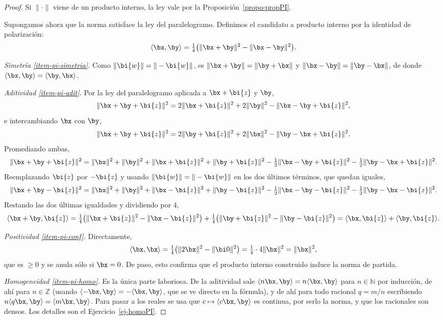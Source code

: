 \begin{proof}
Si $\|\cdot\|$ viene de un producto interno, la ley vale por la
Proposición~\ref{propo-propPI}.

Supongamos ahora que la norma satisface la ley del paralelogramo. Definimos
el candidato a producto interno por la identidad de polarización:
\[
\langle\bx,\by\rangle=\tfrac14\big(\|\bx+\by\|^2-\|\bx-\by\|^2\big) .
\]

\emph{Simetría \ref{item-pi-simetria}.} Como $\|\bi{w}\|=\|-\bi{w}\|$, es
$\|\bx+\by\|=\|\by+\bx\|$ y $\|\bx-\by\|=\|\by-\bx\|$, de donde
$\langle\bx,\by\rangle=\langle\by,\bx\rangle$.

\emph{Aditividad \ref{item-pi-adit}.} Por la ley del paralelogramo aplicada a
$\bx+\bi{z}$ y $\by$,
\[
\|\bx+\by+\bi{z}\|^2=2\|\bx+\bi{z}\|^2+2\|\by\|^2-\|\bx-\by+\bi{z}\|^2 ,
\]
e intercambiando $\bx$ con $\by$,
\[
\|\bx+\by+\bi{z}\|^2=2\|\by+\bi{z}\|^2+2\|\bx\|^2-\|\by-\bx+\bi{z}\|^2 .
\]
Promediando ambas,
\[
\|\bx+\by+\bi{z}\|^2=\|\bx\|^2+\|\by\|^2+\|\bx+\bi{z}\|^2+\|\by+\bi{z}\|^2
-\tfrac12\|\bx-\by+\bi{z}\|^2-\tfrac12\|\by-\bx+\bi{z}\|^2 .
\]
Reemplazando $\bi{z}$ por $-\bi{z}$ y usando $\|\bi{w}\|=\|-\bi{w}\|$ en los
dos últimos términos, que quedan iguales,
\[
\|\bx+\by-\bi{z}\|^2=\|\bx\|^2+\|\by\|^2+\|\bx-\bi{z}\|^2+\|\by-\bi{z}\|^2
-\tfrac12\|\bx-\by-\bi{z}\|^2-\tfrac12\|\by-\bx-\bi{z}\|^2 .
\]
Restando las dos últimas igualdades y dividiendo por $4$,
\[
\langle\bx+\by,\bi{z}\rangle
=\tfrac14\big(\|\bx+\bi{z}\|^2-\|\bx-\bi{z}\|^2\big)
+\tfrac14\big(\|\by+\bi{z}\|^2-\|\by-\bi{z}\|^2\big)
=\langle\bx,\bi{z}\rangle+\langle\by,\bi{z}\rangle .
\]

\emph{Positividad \ref{item-pi-conf}.} Directamente,
\[
\langle\bx,\bx\rangle=\tfrac14\big(\|2\bx\|^2-\|\bi 0\|^2\big)
=\tfrac14\cdot 4\|\bx\|^2=\|\bx\|^2 ,
\]
que es $\ge0$ y se anula sólo si $\bx=0$. De paso, esto confirma que el
producto interno construido induce la norma de partida.

\emph{Homogeneidad \ref{item-pi-homo}.} Es la única parte laboriosa. De la
aditividad sale $\langle n\bx,\by\rangle=n\langle\bx,\by\rangle$ para
$n\in\mathbb{N}$ por inducción, de ahí para $n\in\mathbb{Z}$ (usando
$\langle-\bx,\by\rangle=-\langle\bx,\by\rangle$, que se ve directo en la
fórmula), y de ahí para todo racional $q=m/n$ escribiendo
$n\langle q\bx,\by\rangle=\langle m\bx,\by\rangle$. Para pasar a los reales
se usa que $c\mapsto\langle c\bx,\by\rangle$ es continua, por serlo la norma,
y que los racionales son densos. Los detalles son el
Ejercicio~\ref{ej-homoPI}.
\end{proof}

